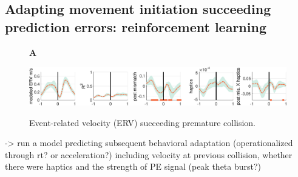 \subsection{Adapting movement initiation succeeding prediction errors: reinforcement learning}

\begin{figure}[h]
  \begin{flushleft}\textbf{A}\end{flushleft}
  \includegraphics[width=\textwidth]{figures/vel_mocap_2.eps}
  \label{vel_erp_post_mismatch}
  \caption{Event-related velocity (ERV) succeeding premature collision.}
\end{figure}

-> run a model predicting subsequent behavioral adaptation (operationalized through rt? or acceleration?) including velocity at previous collision, whether there were haptics and the strength of PE signal (peak theta burst?)